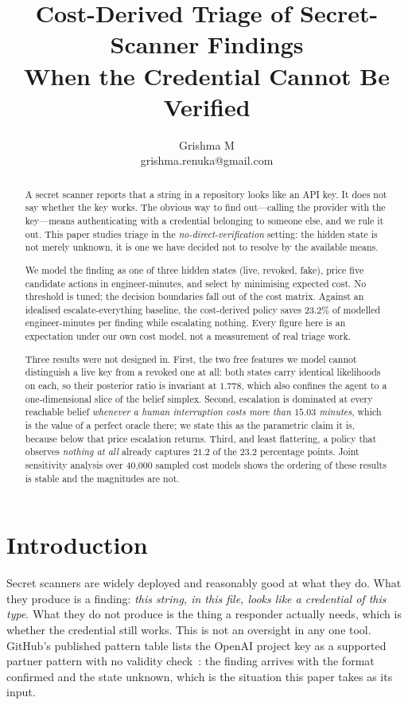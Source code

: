 \documentclass{article}
\title{Cost-Derived Triage of Secret-Scanner Findings\\When the Credential Cannot Be Verified}
\author{
Grishma M\\
\emails
grishma.renuka@gmail.com
}
\begin{document}
\maketitle

\begin{abstract}
A secret scanner reports that a string in a repository looks like an API key. It
does not say whether the key works. The obvious way to find out---calling the
provider with the key---means authenticating with a credential belonging to
someone else, and we rule it out. This paper studies triage in the
\emph{no-direct-verification} setting: the hidden state is not merely unknown,
it is one we have decided not to resolve by the available means.

We model the finding as one of three hidden states (live, revoked, fake), price
five candidate actions in engineer-minutes, and select by minimising expected
cost. No threshold is tuned; the decision boundaries fall out of the cost
matrix. Against an idealised escalate-everything baseline, the cost-derived
policy saves $23.2\%$ of modelled engineer-minutes per finding while escalating
nothing. Every figure here is an expectation under our own cost model, not a
measurement of real triage work.

Three results were not designed in. First, the two free features we model cannot
distinguish a live key from a revoked one at all: both states carry identical
likelihoods on each, so their posterior ratio is invariant at $1.778$, which
also confines the agent to a one-dimensional slice of the belief simplex.
Second, escalation is dominated at every reachable belief \emph{whenever a
human interruption costs more than $15.03$ minutes}, which is the value of a
perfect oracle there; we state this as the parametric claim it is, because
below that price escalation returns. Third, and least flattering, a policy that observes
\emph{nothing at all} already captures $21.2$ of the $23.2$ percentage points.
Joint sensitivity analysis over 40{,}000 sampled cost models shows the ordering
of these results is stable and the magnitudes are not.
\end{abstract}

\section{Introduction}

Secret scanners are widely deployed and reasonably good at what they do. What
they produce is a finding: \emph{this string, in this file, looks like a
credential of this type}. What they do not produce is the thing a responder
actually needs, which is whether the credential still works. This is not an
oversight in any one tool. GitHub's published pattern table lists the OpenAI
project key as a supported partner pattern with no validity
check~\cite{github2026patterns}: the finding arrives with the format confirmed
and the state unknown, which is the situation this paper takes as its input.
\end{document}

